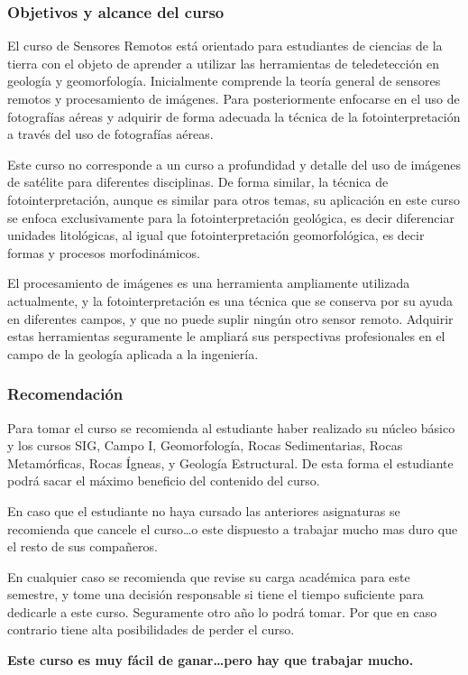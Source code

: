 \documentclass[]{beamer}
\begin{document}
\begin{frame}
\frametitle{Objetivos y alcance del curso}
\justifying
\small{
\par El curso de Sensores Remotos está orientado para estudiantes de ciencias de la tierra con el objeto de aprender a utilizar las herramientas de teledetección en geología y geomorfología. Inicialmente comprende la teoría general de sensores remotos y procesamiento de imágenes. Para posteriormente enfocarse en el uso de fotografías aéreas y adquirir de forma adecuada la técnica de la fotointerpretación a través del uso de fotografías aéreas.\vfill
\par Este curso no corresponde a un curso a profundidad y detalle del uso de imágenes de satélite para diferentes disciplinas. De forma similar, la técnica de fotointerpretación, aunque es similar para otros temas, su aplicación en este curso se enfoca exclusivamente para la fotointerpretación geológica, es decir diferenciar unidades litológicas, al igual que fotointerpretación geomorfológica, es decir formas y procesos morfodinámicos.\vfill
\par El procesamiento de imágenes es una herramienta ampliamente utilizada actualmente, y la fotointerpretación es una técnica que se conserva por su ayuda en diferentes campos, y que no puede suplir ningún otro sensor remoto. Adquirir estas herramientas seguramente le ampliará sus perspectivas profesionales en el campo de la geología aplicada a la ingeniería.
}
\end{frame}
\begin{frame}
\frametitle{Recomendación}
\justifying
\small{
Para tomar el curso se recomienda al estudiante haber realizado su núcleo básico y los cursos SIG, Campo I, Geomorfología, Rocas Sedimentarias, Rocas Metamórficas, Rocas Ígneas, y Geología Estructural. De esta forma el estudiante podrá sacar el máximo beneficio del contenido del curso.\vfill 

En caso que el estudiante no haya cursado las anteriores asignaturas se recomienda que cancele el curso…o este dispuesto a trabajar mucho mas duro que el resto de sus compañeros.\vfill

En cualquier caso se recomienda que revise su carga académica para este semestre, y tome una decisión responsable si tiene el tiempo suficiente para dedicarle a este curso. Seguramente otro año lo podrá tomar. Por que en caso contrario tiene alta posibilidades de perder el curso. \vfill
\begin{center}
\textbf{Este curso es muy fácil de ganar…pero hay que trabajar mucho.}
\end{center}
}
\end{frame}
\end{document}
